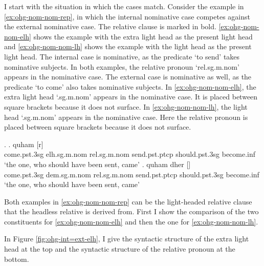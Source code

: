 I start with the situation in which the cases match.
Consider the example in \ref{ex:ohg-nom-nom-rep}, in which the internal nominative case competes against the external nominative case. The relative clause is marked in bold. \ref{ex:ohg-nom-nom-elh} shows the example with the extra light head as the present light head and \ref{ex:ohg-nom-nom-lh} shows the example with the light head as the present light head.
The internal case is nominative, as the predicate  `to send' takes nominative subjects.
In both examples, the relative pronoun  `\ac{rel}.\ac{sg}.\ac{m}.\ac{nom}' appears in the nominative case.
The external case is nominative as well, as the predicate  `to come' also takes nominative subjects.
In \ref{ex:ohg-nom-nom-elh}, the extra light head  `.\ac{sg}.\ac{m}.\ac{nom}' appears in the nominative case. It is placed between square brackets because it does not surface.
In \ref{ex:ohg-nom-nom-lh}, the light head  `.\ac{sg}.\ac{m}.\ac{nom}' appears in the nominative case. Here the relative pronoun is placed between square brackets because it does not surface.

\ex.\label{ex:ohg-nom-nom-rep}
\ag. quham [r]    \\
 come.\ac{pst}.3\ac{sg}\scsub{[nom]} \ac{elh}.\ac{sg}.\ac{m}.\ac{nom} \ac{rel}.\ac{sg}.\ac{m}.\ac{nom} send.\ac{pst}.\ac{ptcp}\scsub{[nom]} should.\ac{pst}.3\ac{sg} become.\ac{inf}\\
 `the one, who should have been sent, came' \label{ex:ohg-nom-nom-elh}
\bg. quham dher []   \\
 come.\ac{pst}.3\ac{sg}\scsub{[nom]} \ac{dem}.\ac{sg}.\ac{m}.\ac{nom} \ac{rel}.\ac{sg}.\ac{m}.\ac{nom} send.\ac{pst}.\ac{ptcp}\scsub{[nom]} should.\ac{pst}.3\ac{sg} become.\ac{inf}\\
 `the one, who should have been sent, came' \label{ex:ohg-nom-nom-lh}

Both examples in \ref{ex:ohg-nom-nom-rep} can be the light-headed relative clause that the headless relative is derived from. First I show the comparison of the two constituents for \ref{ex:ohg-nom-nom-elh} and then the one for \ref{ex:ohg-nom-nom-lh}.

In Figure \ref{fig:ohg-int=ext-elh}, I give the syntactic structure of the extra light head at the top and the syntactic structure of the relative pronoun at the bottom.

